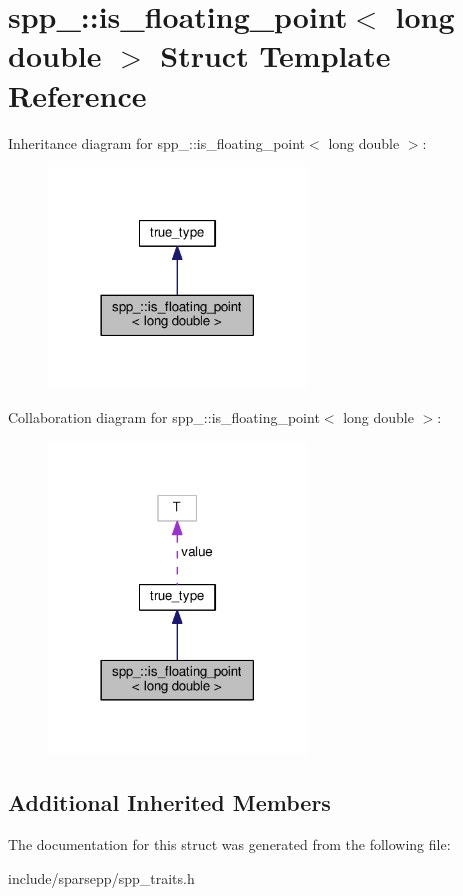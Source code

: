 \hypertarget{structspp___1_1is__floating__point_3_01long_01double_01_4}{}\section{spp\+\_\+\+:\+:is\+\_\+floating\+\_\+point$<$ long double $>$ Struct Template Reference}
\label{structspp___1_1is__floating__point_3_01long_01double_01_4}


Inheritance diagram for spp\+\_\+\+:\+:is\+\_\+floating\+\_\+point$<$ long double $>$\+:\nopagebreak
\begin{figure}[H]
\begin{center}
\leavevmode
\includegraphics[width=194pt]{structspp___1_1is__floating__point_3_01long_01double_01_4__inherit__graph}
\end{center}
\end{figure}


Collaboration diagram for spp\+\_\+\+:\+:is\+\_\+floating\+\_\+point$<$ long double $>$\+:\nopagebreak
\begin{figure}[H]
\begin{center}
\leavevmode
\includegraphics[width=194pt]{structspp___1_1is__floating__point_3_01long_01double_01_4__coll__graph}
\end{center}
\end{figure}
\subsection*{Additional Inherited Members}


The documentation for this struct was generated from the following file\+:\begin{DoxyCompactItemize}
\item 
include/sparsepp/spp\+\_\+traits.\+h\end{DoxyCompactItemize}
